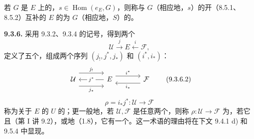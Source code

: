 若 $G$ 是 $E$ 上的，$s\in\operatorname{Hom}(e_E,G)$，则称与 $G$（相应地，$s$）的开（8.5.1、8.5.2）互补的 $E$ 的为 $G$（相应地，$S$）的。

\textbf{9.3.6.} 采用 9.3.2、9.3.4 的记号，得到两个
\[
\mathcal U\xrightarrow{j}E\xleftarrow{i}\mathcal F,\tag{9.3.6.1}
\]
定义了五个，组成两个序列 $(j_!,j^*,j_*)$ 和 $(i^*,i_*)$：
\[
\begin{tikzcd}[column sep=large]
\mathcal U\arrow[r,shift left=2.2ex,"j_!"]\arrow[r,shift right=2.2ex,"j_*"']&E\arrow[l,"j^*" description]\arrow[r,shift left=1.2ex,"i^*"]&\mathcal F\arrow[l,shift left=1.2ex,"i_*"]
\end{tikzcd}\tag{9.3.6.2}
\]
\[
\rho=i_*j^*:\mathcal U\longrightarrow\mathcal F\tag{9.3.6.3}
\]
称为关于 $E$ 的 $U$ 的；更一般地，若 $\mathcal U,\mathcal F$ 是任意两个，则称 $\rho:\mathcal U\to\mathcal F$ 为，若它且（第 I 讲 9.2），或地（1.8），它有一个。这一术语的理由将在下文 9.4.1 d) 和 9.5.4 中显现。

